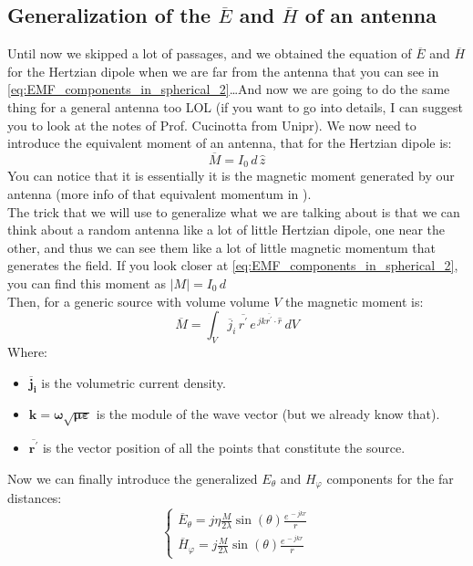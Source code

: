 \subsection*{Generalization of the $\overline{E}$ and $\overline{H}$ of an antenna}
Until now we skipped a lot of passages, and we obtained the equation of $\overline{E}$ and $\overline{H}$ for the Hertzian dipole when we are far from the antenna that you can see in \cref{eq:EMF_components_in_spherical_2}\dots And now we are going to do the same thing for a general antenna too LOL (if you want to go into details, I can suggest you to look at the notes of Prof. Cucinotta from Unipr\cite{Appunti_unipr}).
We now need to introduce the equivalent moment of an antenna, that for the Hertzian dipole is:
\begin{equation}
    \overline{M}=I_0 \, d \, \hat{z}
\end{equation}
You can notice that it is essentially it is the magnetic moment generated by our antenna (more info of that equivalent momentum in \cite{Ellingson2020Radiation}).\\
The trick that we will use to generalize what we are talking about is that we can think about a random antenna like a lot of little Hertzian dipole, one near the other, and thus we can see them like a lot of little magnetic momentum that generates the field. If you look closer at \cref{eq:EMF_components_in_spherical_2}, you can find this moment as $|M|=I_0\,d$\\
Then, for a generic source with volume volume $V$ the magnetic moment is:
\begin{equation}
    \overline{M}=\int_V\overline{j}_i\,\overline{r^\prime}\,e^{\,jk\overline{r^\prime}\cdot \hat{r}}\, dV
\end{equation}
Where:
\begin{itemize}
    \item $\bm{\overline{j}_i}$ is the volumetric current density.
    \item $\bm{k=\omega\sqrt{\mu\varepsilon}}$ is the module of the wave vector (but we already know that).
    \item $\bm{\overline{r^\prime}}$ is the vector position of all the points that constitute the source.
\end{itemize}
Now we can finally introduce the generalized $E_\theta$ and $H_\varphi$ components for the far distances:
\begin{equation}\label{eq:EMF_components_in_spherical_generalized1}
    \begin{cases}
        \overline{E}_\theta = j\eta \frac{M}{2\lambda}\sin(\theta)\frac{e^{\,-jkr}}{r}\\[5pt]
        \overline{H}_\varphi = j\frac{M}{2\lambda}\sin(\theta)\frac{e^{\,-jkr}}{r}
    \end{cases}
\end{equation}
